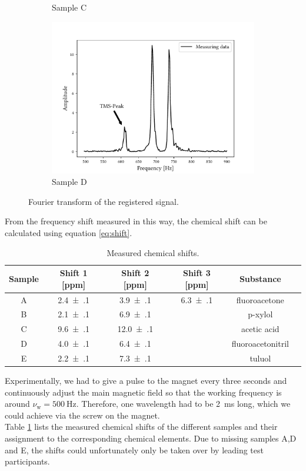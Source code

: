 \begin{figure}[ht]
\begin{subfigure}{.45\textwidth}
\caption{Sample C}
\end{subfigure}
\qquad
\begin{subfigure}{.45\textwidth}
\includegraphics[width=9.3cm]{..//figures//f61_abb_7.pdf}
\caption{Sample D}
\end{subfigure}
\caption{Fourier transform of the registered signal.}
\label{fig:fourier}
\end{figure}
From the frequency shift measured in this way, the chemical shift can be calculated using equation \ref{eq:shift}.
\begin{table}[ht]
\centering
\begin{tabular}{cccccc}
\toprule
Sample & Shift 1 [ppm] & Shift 2 [ppm] & Shift 3 [ppm] & Substance\\
\midrule
A & \num{2.4(1)} & \num{3.9(1)} & \num{6.3(1)} & fluoroacetone\\
B & \num{2.1(1)} & \num{6.9(1)} & & p-xylol\\
C & \num{9.6(1)} & \num{12.0(1)} & & acetic acid\\
D & \num{4.0(1)} & \num{6.4(1)} & & fluoroacetonitril\\
E & \num{2.2(1)} & \num{7.3(1)} & & tuluol\\
\bottomrule
\end{tabular}
\caption{Measured chemical shifts.}
\label{tab:shift}
\end{table}

Experimentally, we had to give a pulse to the magnet every three seconds and continuously adjust the main magnetic field so that the working frequency is around $\nu_\text{w}=\SI{500}{\hertz}$.
Therefore, one wavelength had to be \SI{2}{\milli\second} long, which we could achieve via the screw on the magnet.\\
Table \ref{tab:shift} lists the measured chemical shifts of the different samples and their assignment to the corresponding chemical elements.
Due to missing samples A,D and E, the shifts could unfortunately only be taken over by leading test participants.\\

